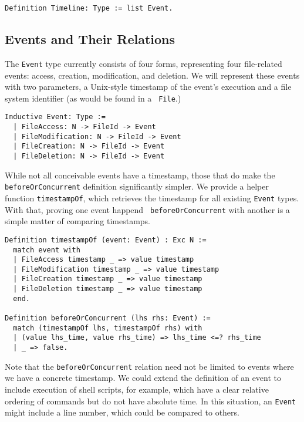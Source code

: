 \documentclass[nocopyrightspace,preprint]{sigplanconf}
\begin{document}
\begin{lstlisting}
Definition Timeline: Type := list Event.
\end{lstlisting}

\subsection{Events and Their Relations}

The {\tt Event} type currently consists of four forms, representing four
file-related events: access, creation, modification, and deletion. We will
represent these events with two parameters, a Unix-style timestamp of the
event's execution and a file system identifier (as would be found in a {\tt
File}.)

\begin{lstlisting}
Inductive Event: Type :=
  | FileAccess: N -> FileId -> Event
  | FileModification: N -> FileId -> Event
  | FileCreation: N -> FileId -> Event
  | FileDeletion: N -> FileId -> Event
\end{lstlisting}

While not all conceivable events have a timestamp, those that do make the {\tt
beforeOrConcurrent} definition significantly simpler. We provide a helper
function {\tt timestampOf}, which retrieves the timestamp for all existing
{\tt Event} types. With that, proving one event happend {\tt
beforeOrConcurrent} with another is a simple matter of comparing timestamps.

\begin{lstlisting}
Definition timestampOf (event: Event) : Exc N :=
  match event with
  | FileAccess timestamp _ => value timestamp
  | FileModification timestamp _ => value timestamp
  | FileCreation timestamp _ => value timestamp
  | FileDeletion timestamp _ => value timestamp
  end.

Definition beforeOrConcurrent (lhs rhs: Event) :=
  match (timestampOf lhs, timestampOf rhs) with
  | (value lhs_time, value rhs_time) => lhs_time <=? rhs_time
  | _ => false.
\end{lstlisting}

Note that the {\tt beforeOrConcurrent} relation need not be limited to events
where we have a concrete timestamp. We could extend the definition of an event
to include execution of shell scripts, for example, which have a clear
relative ordering of commands but do not have absolute time. In this
situation, an {\tt Event} might include a line number, which could be compared
to others.
\end{document}
